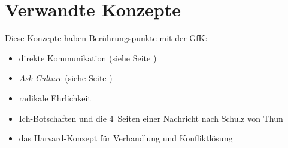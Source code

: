 \section{Verwandte Konzepte}
\label{verwandte-konzepte}

Diese Konzepte haben Berührungspunkte mit der GfK:

\begin{itemize}
  \item direkte Kommunikation (siehe Seite \pageref{direkte-kommunikation})
  \item \emph{Ask-Culture} (siehe Seite \pageref{ask-guess-culture})
  \item radikale Ehrlichkeit \cite{radical-candor, radical-honesty}
  \item Ich-Botschaften und die 4~Seiten einer Nachricht nach Schulz von Thun \cite{miteinander-reden-1}
  \item das Harvard-Konzept \cite{harvard-konzept} für Verhandlung und Konfliktlösung
\end{itemize}
